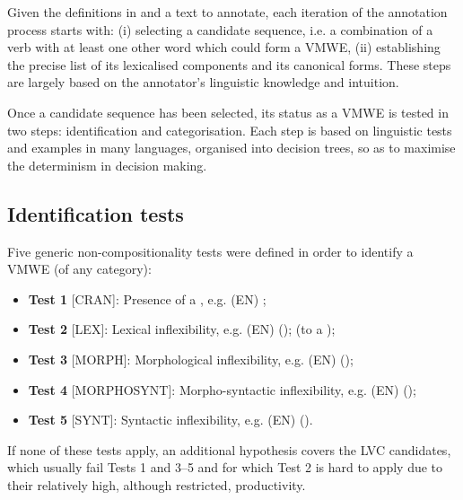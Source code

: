 \documentclass[output=paper,modfonts]{langscibook}
\begin{document}
Given the definitions in   and a text to annotate, each iteration of the annotation process starts with: (i) selecting a candidate sequence, i.e. a combination of a verb  with at least one other word which could form a VMWE, (ii) establishing the precise list of its lexicalised components and its canonical forms. These steps are largely based on the annotator's linguistic knowledge and intuition.

Once a candidate sequence has been selected, its status as a VMWE is tested in two steps: identification and categorisation. Each step is based on linguistic tests and examples in many languages, organised into decision trees, so as to maximise the determinism in decision making. 

%

\subsection{Identification tests}
\label{sec:identify}
%
Five generic non-compositionality tests were defined in order to identify a VMWE (of any category):
\begin{itemize}
\item[]\label{test:cran}\textbf{Test 1} [CRAN]: Presence of a , e.g. (EN) ; 
\item[]\label{test:lex}\textbf{Test 2} [LEX]: Lexical inflexibility, e.g. (EN)  ();  (\ile to { a }); 
\item[]\label{test:morph}\textbf{Test 3} [MORPH]: Morphological inflexibility, e.g. (EN)  (); 
\item[]\label{test:morphosynt}\textbf{Test 4} [MORPHOSYNT]: Morpho-syntactic inflexibility, e.g. (EN)  (); 
\item[]\label{test:synt}\textbf{Test 5} [SYNT]: Syntactic inflexibility, e.g. (EN)  ().
\end{itemize}
If none of these tests apply, an additional hypothesis covers the %
LVC candidates, which usually fail Tests 1 %
and 3--5 
and for which Test 2 %
is hard to apply due to their relatively high, although restricted, productivity. 
\end{document}
